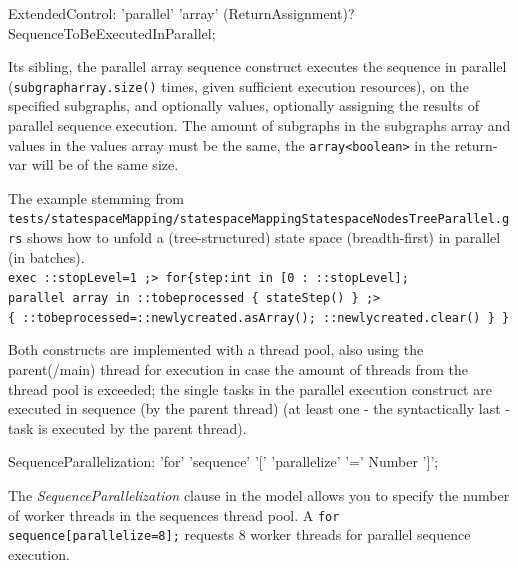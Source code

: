 
\begin{rail}
  ExtendedControl: 'parallel' 'array' (ReturnAssignment)? SequenceToBeExecutedInParallel;
\end{rail}

Its sibling, the parallel array sequence construct executes the sequence in parallel (\texttt{subgraph\-array.size()} times, given sufficient execution resources), on the specified subgraphs, and optionally values, optionally assigning the results of parallel sequence execution.
The amount of subgraphs in the subgraphs array and values in the values array must be the same, the \verb#array<boolean># in the return-var will be of the same size.

\begin{example}
The example stemming from \texttt{tests/statespace\-Mapping/statespace\-Mapping\-Statespace\-Nodes\-Tree\-Parallel.grs} shows how to unfold a (tree-structured) state space (breadth-first) in parallel (in batches).\\
\verb#exec ::stopLevel=1 ;> for{step:int in [0 : ::stopLevel];#\\
\verb#parallel array in ::tobeprocessed { stateStep() } ;>#\\
\verb#{ ::tobeprocessed=::newlycreated.asArray(); ::newlycreated.clear() } }#
\end{example}\label{driverstatespace}


Both constructs are implemented with a thread pool, also using the parent(/main) thread for execution
in case the amount of threads from the thread pool is exceeded;
the single tasks in the parallel execution construct are executed in sequence
(by the parent thread) (at least one - the syntactically last - task is executed by the parent thread).

\begin{rail}
  SequenceParallelization: 'for' 'sequence' '[' 'parallelize' '=' Number ']';
\end{rail}

The \emph{SequenceParallelization} clause in the model allows you to specify the number of worker threads in the sequences thread pool.
A \verb#for sequence[parallelize=8];# requests 8 worker threads for parallel sequence execution.

